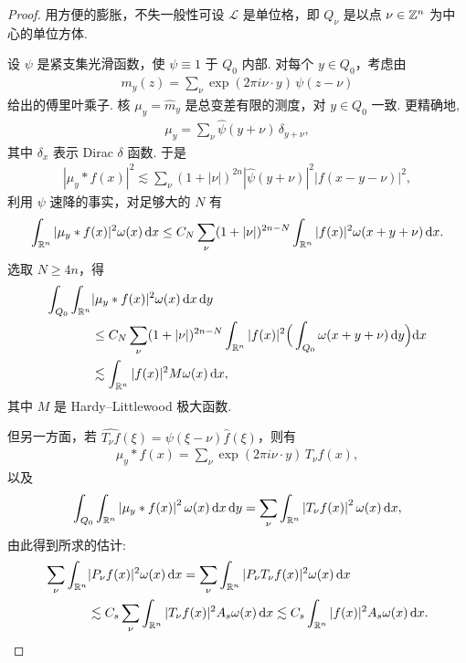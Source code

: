 \begin{proof}
用方便的膨胀，不失一般性可设 $\mathcal{L}$ 是单位格，即 $Q_\nu$ 是以点 $\nu \in \mathbb{Z}^n$ 为中心的单位方体.

设 $\psi$ 是紧支集光滑函数，使 $\psi \equiv 1$ 于 $Q_0$ 内部. 对每个 $y \in Q_0$，考虑由
\begin{align*}
  m_{y}(z)=\sum_{\nu}\exp(2\pi i\nu\cdot y)\,\psi(z-\nu)
\end{align*}
给出的傅里叶乘子. 核 $\mu_y = \widehat{m}_y$ 是总变差有限的测度，对 $y \in Q_0$ 一致. 更精确地,
\begin{align*}
  \mu_{y}=\sum_{\nu}\widehat{\psi}(y+\nu)\,\delta_{y+\nu},
\end{align*}
其中 $\delta_{x}$ 表示 Dirac $\delta$ 函数. 于是
\begin{align*}
  |\mu_{y}*f(x)|^{2}\lesssim\sum_{\nu}(1+|\nu|)^{2n}\left|\widehat{\psi}(y+\nu)\right|^{2}|f(x-y-\nu)|^{2},
\end{align*}
利用 $\psi$ 速降的事实，对足够大的 $N$ 有
\begin{align*}
  \int_{\mathbb{R}^{n}}|\mu_{y}*f(x)|^{2}\omega(x)\,\mathrm{d}x
  \leq C_{N}\sum_{\nu}(1+|\nu|)^{2n-N}\int_{\mathbb{R}^{n}}|f(x)|^{2}\omega(x+y+\nu)\,\mathrm{d}x.
\end{align*}
选取 $N \geq 4n$，得
\begin{align*}
  \int_{Q_{0}}\int_{\mathbb{R}^{n}}&|\mu_{y}*f(x)|^{2}\omega(x)\,\mathrm{d}x\,\mathrm{d}y\\
  &\leq C_{N}\sum_{\nu}(1+|\nu|)^{2n-N}\int_{\mathbb{R}^{n}}|f(x)|^{2}\Big(\int_{Q_{0}}\omega(x+y+\nu)\,\mathrm{d}y\Big)\mathrm{d}x\\
  &\lesssim\int_{\mathbb{R}^{n}}|f(x)|^{2}M\omega(x)\,\mathrm{d}x,
\end{align*}
其中 $M$ 是 Hardy--Littlewood 极大函数.

但另一方面，若 $\widehat{T_{\nu}f}(\xi)=\psi(\xi-\nu)\widehat{f}(\xi)$，则有
\begin{align*}
  \mu_{y}*f(x)=\sum_{\nu}\exp(2\pi i\nu\cdot y)\,T_{\nu}f(x),
\end{align*}
以及
\begin{align*}
  \int_{Q_{0}}\int_{\mathbb{R}^{n}}\left|\mu_{y}*f(x)\right|^{2}\omega(x)\,\mathrm{d}x\,\mathrm{d}y
  =\sum_{\nu}\int_{\mathbb{R}^{n}}\left|T_{\nu}f(x)\right|^{2}\omega(x)\,\mathrm{d}x,
\end{align*}
由此得到所求的估计:
\begin{align*}
  \sum_{\nu}\int_{\mathbb{R}^{n}}&|P_{\nu}f(x)|^{2}\omega(x)\,\mathrm{d}x
  =\sum_{\nu}\int_{\mathbb{R}^{n}}|P_{\nu}T_{\nu}f(x)|^{2}\omega(x)\,\mathrm{d}x\\
  &\lesssim C_{s}\sum_{\nu}\int_{\mathbb{R}^{n}}|T_{\nu}f(x)|^{2}A_{s}\omega(x)\,\mathrm{d}x
  \lesssim C_{s}\int_{\mathbb{R}^{n}}|f(x)|^{2}A_{s}\omega(x)\,\mathrm{d}x.
\end{align*}
\end{proof}

